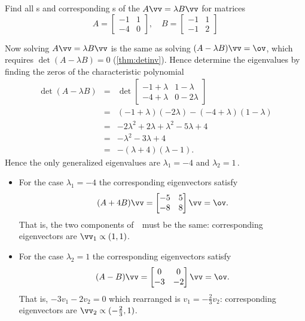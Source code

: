 \begin{reduce}
\begin{example} 
Find all s and corresponding s of the  \(A\vv=\lambda B\vv\) for matrices
\begin{equation*}
A=\begin{bmatrix} -1&1\\-4&0 \end{bmatrix},\quad
B=\begin{bmatrix} -1&1\\-1&2 \end{bmatrix}
\end{equation*}
\begin{solution} 
Now solving \(A\vv=\lambda B\vv\) is the same as solving \((A-\lambda B)\vv=\ov\), which requires \(\det(A-\lambda B)=0\) (\autoref{thm:detinv}).
Hence determine the eigenvalues by finding the zeros of the characteristic polynomial
\begin{eqnarray*}
\det(A-\lambda B)
&=&\det\begin{bmatrix} -1+\lambda&1-\lambda\\-4+\lambda&0-2\lambda \end{bmatrix}
\\&=&(-1+\lambda)(-2\lambda)-(-4+\lambda)(1-\lambda)
\\&=&-2\lambda^2+2\lambda+\lambda^2-5\lambda+4
\\&=&-\lambda^2-3\lambda+4
\\&=&-(\lambda+4)(\lambda-1).
\end{eqnarray*}
Hence the only generalized eigenvalues are \(\lambda_1=-4\) and \(\lambda_2=1\)\,.
\begin{itemize}
\item For the case \(\lambda_1=-4\) the corresponding eigenvectors satisfy
\begin{equation*}
(A+4B)\vv=\begin{bmatrix} -5&5\\-8&8 \end{bmatrix}\vv=\ov.
\end{equation*}
That is, the two components of~\vv\ must be the same: corresponding eigenvectors are \(\vv_1\propto(1,1)\).

\item For the case \(\lambda_2=1\) the corresponding eigenvectors satisfy
\begin{equation*}
(A-B)\vv=\begin{bmatrix} 0&0\\-3&-2 \end{bmatrix}\vv=\ov.
\end{equation*}
That is, \(-3v_1-2v_2=0\) which rearranged is \(v_1=-\tfrac23v_2\): corresponding eigenvectors are \(\vv_2\propto(-\tfrac23,1)\).
\end{itemize}
\end{solution}
\end{example}





\end{reduce}
